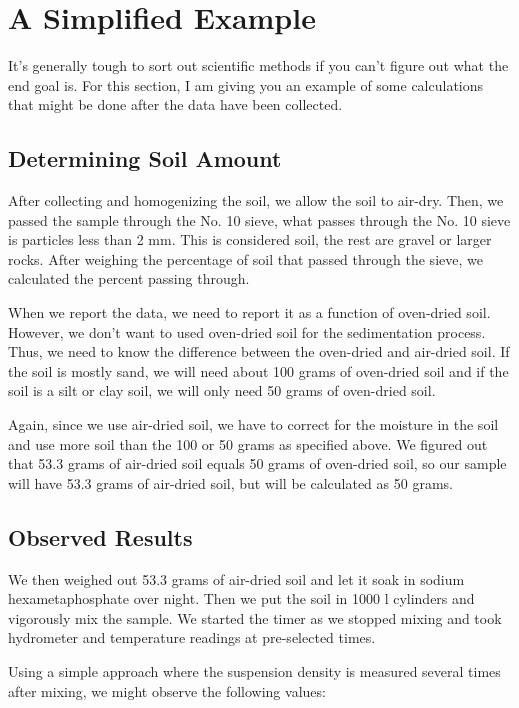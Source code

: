 \documentclass{tufte-handout}
\begin{document}
\section{A Simplified Example}

It's generally tough to sort out scientific methods if you can't figure out what the end goal is. For this section, I am giving you an example of some calculations that might be done after the data have been collected.


\subsection{Determining Soil Amount}

After collecting and homogenizing the soil, we allow the soil to air-dry. Then, we passed the sample through the No. 10 sieve, what passes through the No. 10 sieve is particles less than 2 mm. This is considered soil, the rest are gravel or larger rocks. After weighing the percentage of soil that passed through the sieve, we calculated the percent passing through. 

When we report the data, we need to report it as a function of oven-dried soil. However, we don't want to used oven-dried soil for the sedimentation process. Thus, we need to know the difference between the oven-dried and air-dried soil. If the soil is mostly sand, we will need about 100 grams of oven-dried soil and if the soil is a silt or clay soil, we will only need 50 grams of oven-dried soil. 

Again, since we use air-dried soil, we have to correct for the moisture in the soil and use more soil than the 100 or 50 grams as specified above. We figured out that 53.3 grams of air-dried soil equals 50 grams of oven-dried soil, so our sample will have 53.3 grams of air-dried soil, but will be calculated as 50 grams.

\subsection{Observed Results}


We then weighed out 53.3 grams of air-dried soil and let it soak in sodium hexametaphosphate over night. Then we put the soil in 1000 l cylinders and vigorously mix the sample. We started the timer as we stopped mixing and took hydrometer and temperature readings at pre-selected times. 

Using a simple approach where the suspension density is measured several times after mixing, we might observe the following values:
\end{document}
